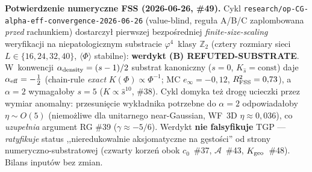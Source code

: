 \begin{remark}[Status $\alpha=2$ po~v2-pivocie --- 2026-04-25]
\medskip\noindent\textbf{Potwierdzenie numeryczne FSS (2026-06-26, \#49).}
Cykl \texttt{research/op-CG-alpha-eff-convergence-2026-06-26} (value-blind, regu\l{}a
A/B/C zaplombowana \emph{przed} rachunkiem) dostarczy\l{} pierwszej bezpo\'sredniej
\emph{finite-size-scaling} weryfikacji na niepatologicznym substracie $\varphi^4$~klasy
$\mathbb{Z}_2$ (cztery rozmiary sieci $L\in\{16,24,32,40\}$, $\langle\Phi\rangle$ stabilne):
\textbf{werdykt (B) REFUTED-SUBSTRATE}. W~konwencji $\alpha_{\rm density}=(s-1)/2$ substrat
kanoniczny ($s=0$, $K_{\hat s}=\mathrm{const}$) daje $\alpha_{\rm eff}=-\tfrac12$
(chain-rule \emph{exact} $K(\Phi)\propto\Phi^{-1}$; MC $e_{\infty}=-0{,}12$, $R^2_{\rm FSS}=0{,}73$),
a~$\alpha=2$ wymaga\l{}oby $s=5$ ($K\propto\hat s^{10}$, \#38). Cykl domyka te\.z drog\k{e}
ucieczki przez wymiar anomalny: przesuni\k{e}cie wyk\l{}adnika potrzebne do $\alpha=2$
odpowiada\l{}oby $\eta\sim O(5)$ (niemo\.zliwe dla unitarnego near-Gaussian, WF~3D
$\eta\approx0{,}036$), co \emph{uzupe\l{}nia} argument RG \#39 ($\gamma\approx-5/6$). Werdykt
\textbf{nie falsyfikuje} TGP --- \emph{ratyfikuje} status ,,nieredukowalnie aksjomatyczne
na g\k{e}sto\'sci'' od strony numeryczno-substratowej (czwarty korzeń obok $c_0$~\#37,
$\mathcal{A}$~\#43, $K_{\rm geo}$~\#48). Bilans input\'ow bez zmian.
\end{remark}

